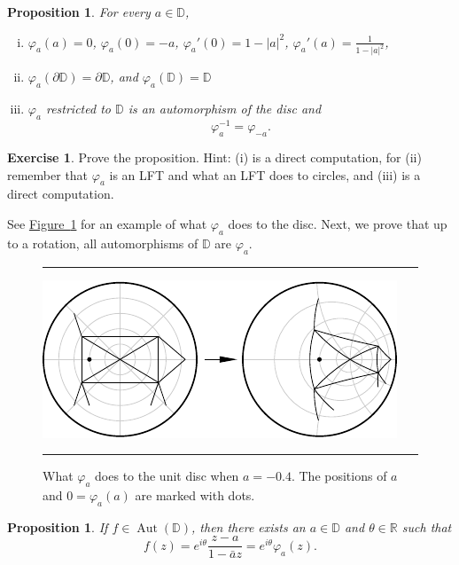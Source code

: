 \documentclass[12pt,openany]{book}
\newcommand{\sabs}[1]{\lvert {#1} \rvert}
\newcommand{\R}{{\mathbb{R}}}
\newcommand{\D}{{\mathbb{D}}}
\theoremstyle{plain}
\newtheorem{prop}[thm]{Proposition}
\theoremstyle{remark}
\theoremstyle{definition}
\newenvironment{exbox}{%
    \def\FrameCommand{\vrule width 1pt \relax\hspace{10pt}}%
    \MakeFramed{\advance\hsize-\width\FrameRestore}%
}{%
    \endMakeFramed
}
\newenvironment{myfig}{%
\begin{figure}[h!t]
\noindent\rule{\textwidth}{0.5pt}\vspace{12pt}\par\centering}%
{\par\noindent\rule{\textwidth}{0.5pt}
\end{figure}}
\theoremstyle{exercise}
\newtheorem{exercise}{Exercise}[section]
\theoremstyle{example}
\newcommand{\figureref}[1]{\hyperref[#1]{Figure~\ref*{#1}}}
\begin{document}
\begin{prop}
For every $a \in \D$,
\begin{enumerate}[(i)]
\item
$\varphi_a(a) = 0$, \enspace
$\varphi_a(0) = -a$, \enspace
$\varphi_a'(0) = 1 - \sabs{a}^2$, \enspace
$\varphi_a'(a) = \frac{1}{1 - \sabs{a}^2}$,
\item
$\varphi_a(\partial \D) = \partial \D$,
and
$\varphi_a(\D) = \D$
\item
$\varphi_a$ restricted to $\D$ is an automorphism of the disc and
\begin{equation*}
\varphi_a^{-1} = \varphi_{-a} .
\end{equation*}
\end{enumerate}
\end{prop}

\begin{exbox}
\begin{exercise}
Prove the proposition.
Hint: (i) is a direct computation, for (ii)
remember that
$\varphi_a$ is an LFT and what an LFT does to circles,
and (iii) is a direct computation.
\end{exercise}
\end{exbox}

See \figureref{fig:varphiplot} for an example of what $\varphi_a$ does to the disc.
Next, we prove that up to a rotation, all automorphisms of $\D$ are
$\varphi_a$.
\begin{myfig}
\includegraphics{figures/varphiplot}
\caption{What $\varphi_a$ does to the unit disc when $a=-0.4$.   The positions of $a$ and $0=\varphi_a(a)$ are marked with dots.%
\label{fig:varphiplot}}
\end{myfig}

\begin{prop}
If $f \in \operatorname{Aut}(\D)$, then there exists an $a \in \D$
and $\theta \in \R$ such that
\begin{equation*}
f(z) = e^{i\theta} \frac{z-a}{1-\bar{a}z} = e^{i\theta} \varphi_a(z).
\end{equation*}
\end{prop}
\end{document}
